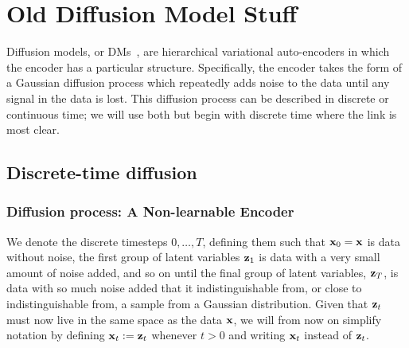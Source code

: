 \chapter{Old Diffusion Model Stuff}

Diffusion models, or DMs~\citep{sohl2015deep,ho2020denoising,nichol2021improved,song2020score}, are hierarchical variational auto-encoders in which the encoder has a particular structure. Specifically, the encoder takes the form of a Gaussian diffusion process which repeatedly adds noise to the data until any signal in the data is lost. This diffusion process can be described in discrete or continuous time; we will use both but begin with discrete time where the link is most clear.

\section{Discrete-time diffusion}
\subsection{Diffusion process: A Non-learnable Encoder}
We denote the discrete timesteps $0,\ldots,T$, defining them such that ${\mathbf{x}}_0={\mathbf{x}}$ is data without noise, the first group of latent variables ${\mathbf{z}}_1$ is data with a very small amount of noise added, and so on until the final group of latent variables, ${\mathbf{z}}_T$, is data with so much noise added that it indistinguishable from, or close to indistinguishable from, a sample from a Gaussian distribution. Given that ${\mathbf{z}}_t$ must now live in the same space as the data ${\mathbf{x}}$, we will from now on simplify notation by defining ${\mathbf{x}}_t := {\mathbf{z}}_t$ whenever $t > 0$ and writing ${\mathbf{x}}_t$ instead of ${\mathbf{z}}_t$.

